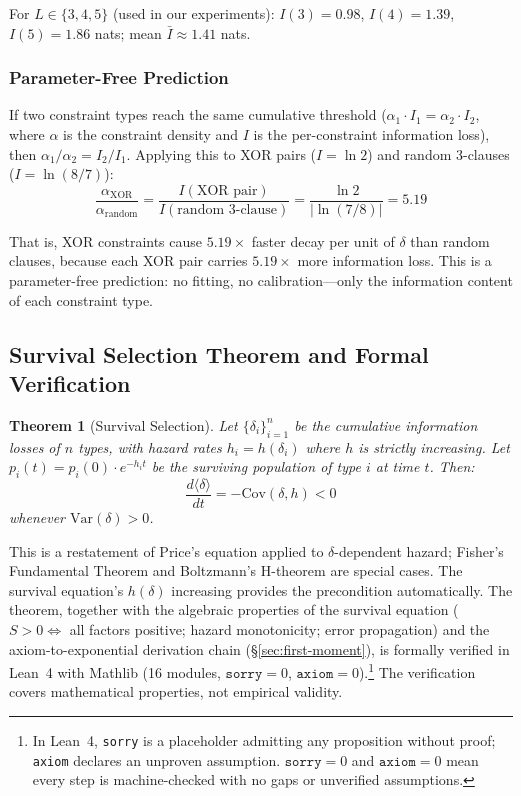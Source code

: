 \documentclass[11pt,a4paper]{article}
\newtheorem{theorem}{Theorem}[section]
\begin{document}
For $L \in \{3, 4, 5\}$ (used in our experiments): $I(3) = 0.98$, $I(4) = 1.39$, $I(5) = 1.86$ nats; mean $\bar{I} \approx 1.41$ nats.

\subsubsection{Parameter-Free Prediction}

If two constraint types reach the same cumulative threshold ($\alpha_1 \cdot I_1 = \alpha_2 \cdot I_2$, where $\alpha$ is the constraint density and $I$ is the per-constraint information loss), then $\alpha_1 / \alpha_2 = I_2 / I_1$. Applying this to XOR pairs ($I = \ln 2$) and random 3-clauses ($I = \ln(8/7)$):
\begin{equation}
\frac{\alpha_{\text{XOR}}}{\alpha_{\text{random}}} = \frac{I(\text{XOR pair})}{I(\text{random 3-clause})} = \frac{\ln 2}{|\ln(7/8)|} = 5.19
\label{eq:ratio-prediction}
\end{equation}

That is, XOR constraints cause $5.19\times$ faster decay per unit of $\delta$ than random clauses, because each XOR pair carries $5.19\times$ more information loss. This is a parameter-free prediction: no fitting, no calibration---only the information content of each constraint type.

\subsection{Survival Selection Theorem and Formal Verification}
\label{sec:h-theorem}

\begin{theorem}[Survival Selection]
\label{thm:h}
Let $\{\delta_i\}_{i=1}^{n}$ be the cumulative information losses of $n$ types, with hazard rates $h_i = h(\delta_i)$ where $h$ is strictly increasing. Let $p_i(t) = p_i(0) \cdot e^{-h_i t}$ be the surviving population of type $i$ at time $t$. Then:
\[
\frac{d\langle\delta\rangle}{dt} = -\mathrm{Cov}(\delta, h) < 0
\]
whenever $\mathrm{Var}(\delta) > 0$.
\end{theorem}

This is a restatement of Price's equation \citep{price1970} applied to $\delta$-dependent hazard; Fisher's Fundamental Theorem \citep{fisher1930} and Boltzmann's H-theorem are special cases. The survival equation's $h(\delta)$ increasing provides the precondition automatically. The theorem, together with the algebraic properties of the survival equation ($S > 0 \Leftrightarrow$ all factors positive; hazard monotonicity; error propagation) and the axiom-to-exponential derivation chain (\S\ref{sec:first-moment}), is formally verified in Lean~4 \citep{demoura2021} with Mathlib (16 modules, $\texttt{sorry} = 0$, $\texttt{axiom} = 0$).\footnote{In Lean~4, \texttt{sorry} is a placeholder admitting any proposition without proof; \texttt{axiom} declares an unproven assumption. $\texttt{sorry} = 0$ and $\texttt{axiom} = 0$ mean every step is machine-checked with no gaps or unverified assumptions.} The verification covers mathematical properties, not empirical validity.
\end{document}
